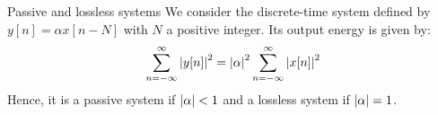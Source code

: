 \documentclass[../../main/main.tex]{subfiles}
\begin{document}
\begin{example}{Passive and lossless systems}{}
    We consider the discrete-time system defined by \( y[n] = \alpha x[n-N] \) with \( N \) a positive integer. Its output energy is given by:
    \begin{equation}
        \sum_{n = -\infty}^{\infty} \abs{y[n]}^{2}
        =
        \abs{\alpha}^{2} \sum_{n = -\infty}^{\infty} \abs{x[n]}^{2}
        \label{eq:L03_S42_1}
    \end{equation}
    Hence, it is a passive system if \( \abs{\alpha} < 1 \) and a lossless system if \( \abs{\alpha} = 1 \).
\end{example}
\end{document}
